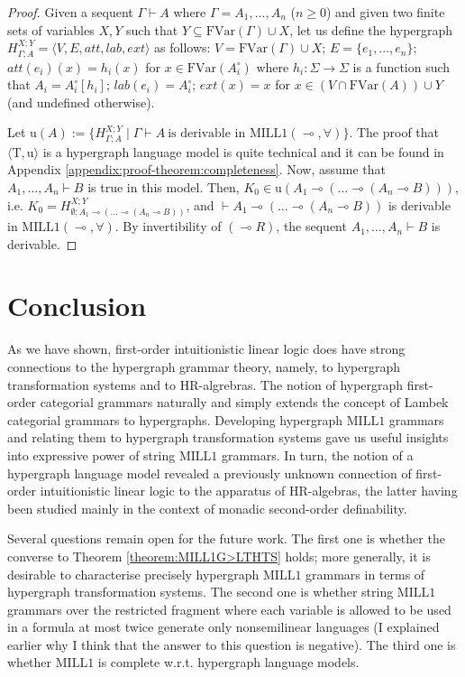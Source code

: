 \documentclass[a4paper,UKenglish,cleveref, autoref, thm-restate,pdfa]{lipics-v2021}
\newcommand{\eqdef}{:=}
\newcommand{\lab}{\mathit{lab}}
\newcommand{\att}{\mathit{att}}
\newcommand{\ext}{\mathit{ext}}
\newcommand{\FVar}{\mathrm{FVar}}
\newcommand{\limpl}{\multimap}
\newcommand{\MILLFO}{\mathrm{MILL}1}
\begin{document}
\begin{proof}
	Given a sequent $\Gamma \vdash A$ where $\Gamma = A_1,\ldots,A_n$ ($n \ge 0$) and given two finite sets of variables $X,Y$ such that $Y \subseteq \FVar(\Gamma) \cup X$, let us define the hypergraph $H^{X;Y}_{\Gamma;A} = \langle V, E, \att,\lab,\ext\rangle$ as follows: $V = \FVar(\Gamma) \cup X$;  $E = \{e_1,\ldots,e_n\}$; $\att(e_i)(x) = h_i(x)$ for $x \in \FVar(A_i^\circ)$ where $h_i:\Sigma \to \Sigma$ is a function such that $A_i = A_i^\circ[h_i]$; $\lab(e_i) = A^\circ_i$; $\ext(x) = x$ for $x \in (V \cap \FVar(A)) \cup Y$ (and undefined otherwise).
	
	Let $\mathrm{u}(A) \eqdef \{H^{X;Y}_{\Gamma;A} \mid \Gamma \vdash A~\text{is derivable in $\MILLFO(\limpl,\forall)$}\}$. The proof that $\langle \mathrm{T},\mathrm{u} \rangle$ is a hypergraph language model is quite technical and it can be found in Appendix \ref{appendix:proof-theorem:completeness}.
	Now, assume that $A_1,\ldots,A_n \vdash B$ is true in this model. Then, $K_0 \in \mathrm{u}(A_1 \limpl (\ldots \limpl (A_n \limpl B)))$, i.e. $K_0 = H^{X;Y}_{\emptyset;A_1 \limpl (\ldots \limpl (A_n \limpl B))}$, and $\vdash A_1 \limpl (\ldots \limpl (A_n \limpl B))$ is derivable in $\MILLFO(\limpl,\forall)$. By invertibility of $(\limpl R)$, the sequent $A_1,\ldots,A_n \vdash B$ is derivable.
\end{proof}


\section{Conclusion}\label{section:conclusion}

As we have shown, first-order intuitionistic linear logic does have strong connections to the hypergraph grammar theory, namely, to hypergraph transformation systems and to HR-algrebras. The notion of hypergraph first-order categorial grammars naturally and simply extends the concept of Lambek categorial grammars to hypergraphs. Developing hypergraph $\MILLFO$ grammars and relating them to hypergraph transformation systems gave us useful insights into expressive power of string $\MILLFO$ grammars. In turn, the notion of a hypergraph language model revealed a previously unknown connection of first-order intuitionistic linear logic to the apparatus of HR-algebras, the latter having been studied mainly in the context of monadic second-order definability.

Several questions remain open for the future work. The first one is whether the converse to Theorem \ref{theorem:MILL1G>LTHTS} holds; more generally, it is desirable to characterise precisely hypergraph $\MILLFO$ grammars in terms of hypergraph transformation systems. The second one is whether string $\MILLFO$ grammars over the restricted fragment where each variable is allowed to be used in a formula at most twice generate only nonsemilinear languages (I explained earlier why I think that the answer to this question is negative). The third one is whether $\MILLFO$ is complete w.r.t. hypergraph language models.
\end{document}
